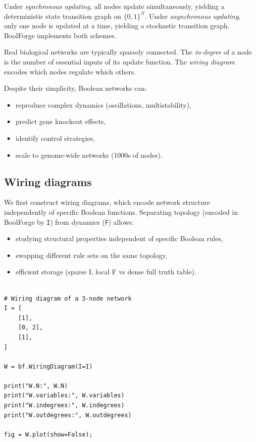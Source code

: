 \documentclass[
]{article}
\providecommand{\tightlist}{%
  \setlength{\itemsep}{0pt}\setlength{\parskip}{0pt}}
\begin{document}
Under \emph{synchronous updating}, all nodes update simultaneously,
yielding a deterministic state transition graph on \(\{0,1\}^N\). Under
\emph{asynchronous updating}, only one node is updated at a time,
yielding a stochastic transition graph. BoolForge implements both
schemes.

Real biological networks are typically sparsely connected. The
\emph{in-degree} of a node is the number of essential inputs of its
update function. The \emph{wiring diagram} encodes which nodes regulate
which others.

Despite their simplicity, Boolean networks can:

\begin{itemize}
\tightlist
\item
  reproduce complex dynamics (oscillations, multistability),
\item
  predict gene knockout effects,
\item
  identify control strategies,
\item
  scale to genome-wide networks (1000s of nodes).
\end{itemize}

\subsection{Wiring diagrams}\label{wiring-diagrams}

We first construct wiring diagrams, which encode network structure
independently of specific Boolean functions. Separating topology
(encoded in BoolForge by \texttt{I}) from dynamics (\texttt{F}) allows:

\begin{itemize}
\tightlist
\item
  studying structural properties independent of specific Boolean rules,
\item
  swapping different rule sets on the same topology,
\item
  efficient storage (sparse I, local F vs dense full truth table).
\end{itemize}

\begin{lstlisting}

# Wiring diagram of a 3-node network
I = [
    [1],
    [0, 2],
    [1],
]

W = bf.WiringDiagram(I=I)

print("W.N:", W.N)
print("W.variables:", W.variables)
print("W.indegrees:", W.indegrees)
print("W.outdegrees:", W.outdegrees)

fig = W.plot(show=False);
\end{lstlisting}
\end{document}
